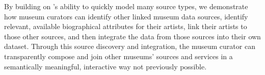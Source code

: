 By building on \karma's ability to quickly model many source types, we demonstrate how museum curators can identify other linked museum data sources, identify relevant, available biographical attributes for their artists, link their artists to those other sources, and then integrate the data from those sources into their own dataset. 
Through this source discovery and integration, the museum curator can transparently compose and join other museums' sources and services in a semantically meaningful, interactive way not previously possible.